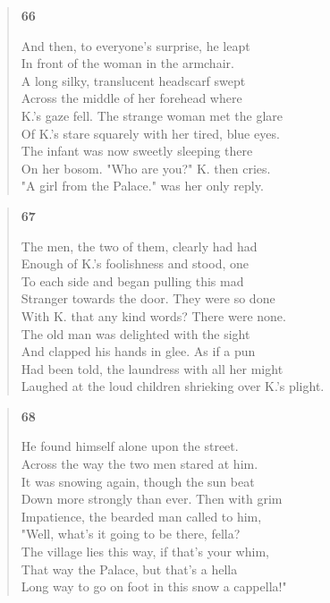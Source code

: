 \documentclass{article}
\begin{document}
\begin{verse}
  \begin{center}
    \textbf{66} \\
  \end{center}
  And then, to everyone's surprise, he leapt \\
  In front of the woman in the armchair. \\
  A long silky, translucent headscarf swept \\
  Across the middle of her forehead where \\
  K.'s gaze fell. The strange woman met the glare \\
  Of K.'s stare squarely with her tired, blue eyes. \\
  The infant was now sweetly sleeping there \\
  On her bosom. "Who are you?" K. then cries. \\
  "A girl from the Palace." was her only reply.
\end{verse}
\begin{verse}
  \begin{center}
    \textbf{67} \\
  \end{center}
  The men, the two of them, clearly had had \\
  Enough of K.'s foolishness and stood, one \\
  To each side and began pulling this mad \\
  Stranger towards the door. They were so done \\
  With K. that any kind words? There were none. \\
  The old man was delighted with the sight \\
  And clapped his hands in glee. As if a pun \\
  Had been told, the laundress with all her might \\
  Laughed at the loud children shrieking over K.'s plight.
\end{verse}
\newpage
\begin{verse}
  \begin{center}
    \textbf{68} \\
  \end{center}
  He found himself alone upon the street. \\
  Across the way the two men stared at him. \\
  It was snowing again, though the sun beat \\
  Down more strongly than ever. Then with grim \\
  Impatience, the bearded man called to him, \\
  "Well, what's it going to be there, fella? \\
  The village lies this way, if that's your whim, \\
  That way the Palace, but that's a hella \\
  Long way to go on foot in this snow a cappella!"
\end{verse}
\end{document}

